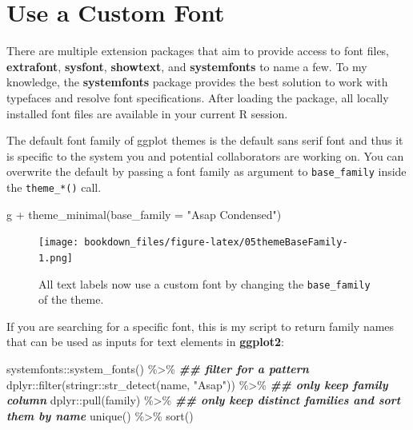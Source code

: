 \documentclass[
]{krantz}
\makeatletter
\newenvironment{Shaded}{\begin{snugshade}}{\end{snugshade}}
\newcommand{\AttributeTok}[1]{\textcolor[rgb]{0.61,0.61,0.61}{#1}}
\newcommand{\DocumentationTok}[1]{\textcolor[rgb]{0.37,0.37,0.37}{\textbf{\textit{#1}}}}
\newcommand{\FunctionTok}[1]{\textcolor[rgb]{0,0,0}{#1}}
\newcommand{\NormalTok}[1]{#1}
\newcommand{\SpecialCharTok}[1]{\textcolor[rgb]{0,0,0}{#1}}
\newcommand{\StringTok}[1]{\textcolor[rgb]{0.5,0.5,0.5}{#1}}
\newenvironment{kframe}{%
\medskip{}
\setlength{\fboxsep}{.8em}
 \def\at@end@of@kframe{}%
 \ifinner\ifhmode%
  \def\at@end@of@kframe{\end{minipage}}%
  \begin{minipage}{\columnwidth}%
 \fi\fi%
 \def\FrameCommand##1{\hskip\@totalleftmargin \hskip-\fboxsep
 \colorbox{shadecolor}{##1}\hskip-\fboxsep
     \hskip-\linewidth \hskip-\@totalleftmargin \hskip\columnwidth}%
 \MakeFramed {\advance\hsize-\width
   \@totalleftmargin\z@ \linewidth\hsize
   \@setminipage}}%
 {\par\unskip\endMakeFramed%
 \at@end@of@kframe}
\renewenvironment{Shaded}{\begin{kframe}}{\end{kframe}}
\makeatother
\begin{document}
\hypertarget{use-a-custom-font}{%
\section{Use a Custom Font}\label{use-a-custom-font}}

There are multiple extension packages that aim to provide access to font files, \textbf{extrafont}, \textbf{sysfont}, \textbf{showtext}, and \textbf{systemfonts} to name a few. To my knowledge, the \textbf{systemfonts} package provides the best solution to work with typefaces and resolve font specifications. After loading the package, all locally installed font files are available in your current R session.

The default font family of ggplot themes is the default sans serif font and thus it is specific to the system you and potential collaborators are working on. You can overwrite the default by passing a font family as argument to \texttt{base\_family} inside the \texttt{theme\_*()} call.

\begin{Shaded}
\begin{Highlighting}[]
\NormalTok{g }\SpecialCharTok{+} \FunctionTok{theme\_minimal}\NormalTok{(}\AttributeTok{base\_family =} \StringTok{"Asap Condensed"}\NormalTok{)}
\end{Highlighting}
\end{Shaded}

\begin{figure}
\centering
\texttt{[image: bookdown\_files/figure-latex/05themeBaseFamily-1.png]}
\caption{\label{fig:05themeBaseFamily}All text labels now use a custom font by changing the \texttt{base\_family} of the theme.}
\end{figure}

If you are searching for a specific font, this is my script to return family names that can be used as inputs for text elements in \textbf{ggplot2}:

\begin{Shaded}
\begin{Highlighting}[]
\NormalTok{systemfonts}\SpecialCharTok{::}\FunctionTok{system\_fonts}\NormalTok{() }\SpecialCharTok{\%\textgreater{}\%} 
  \DocumentationTok{\#\# filter for a pattern}
\NormalTok{  dplyr}\SpecialCharTok{::}\FunctionTok{filter}\NormalTok{(stringr}\SpecialCharTok{::}\FunctionTok{str\_detect}\NormalTok{(name, }\StringTok{"Asap"}\NormalTok{)) }\SpecialCharTok{\%\textgreater{}\%} 
  \DocumentationTok{\#\# only keep family column}
\NormalTok{  dplyr}\SpecialCharTok{::}\FunctionTok{pull}\NormalTok{(family) }\SpecialCharTok{\%\textgreater{}\%} 
  \DocumentationTok{\#\# only keep distinct families and sort them by name}
  \FunctionTok{unique}\NormalTok{() }\SpecialCharTok{\%\textgreater{}\%} 
  \FunctionTok{sort}\NormalTok{()}
\end{Highlighting}
\end{Shaded}
\end{document}
